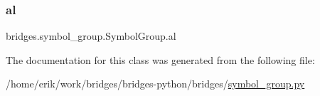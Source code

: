 \subsubsection{\texorpdfstring{al}{al}}
{\footnotesize\ttfamily bridges.\+symbol\+\_\+group.\+Symbol\+Group.\+al}



The documentation for this class was generated from the following file\+:\begin{DoxyCompactItemize}
\item 
/home/erik/work/bridges/bridges-\/python/bridges/\hyperlink{symbol__group_8py}{symbol\+\_\+group.\+py}\end{DoxyCompactItemize}

